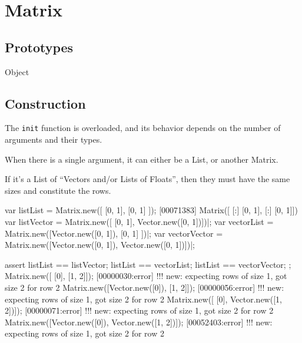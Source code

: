 
\section{Matrix}

\subsection{Prototypes}
\begin{refObjects}
\item[Object]
\end{refObjects}

\subsection{Construction}
\label{sec:specs:matrix:ctor}

The \lstinline|init| function is overloaded, and its behavior depends on the
number of arguments and their types.

When there is a single argument, it can either be a List, or another Matrix.

If it's a List of ``Vectors and/or Lists of Floats'', then they must have
the same sizes and constitute the rows.

\begin{urbiscript}
var listList     = Matrix.new([           [0, 1],             [0, 1] ]);
[00071383] Matrix([
[:]  [0, 1],
[:]  [0, 1]])
var listVector   = Matrix.new([           [0, 1],  Vector.new([0, 1])])|;
var vectorList   = Matrix.new([Vector.new([0, 1]),            [0, 1] ])|;
var vectorVector = Matrix.new([Vector.new([0, 1]), Vector.new([0, 1])])|;

assert
{
  listList == listVector;
  listList == vectorList;
  listList == vectorVector;
};
Matrix.new([           [0],            [1, 2]]);
[00000030:error] !!! new: expecting rows of size 1, got size 2 for row 2
Matrix.new([Vector.new([0]),           [1, 2]]);
[00000056:error] !!! new: expecting rows of size 1, got size 2 for row 2
Matrix.new([           [0], Vector.new([1, 2])]);
[00000071:error] !!! new: expecting rows of size 1, got size 2 for row 2
Matrix.new([Vector.new([0]), Vector.new([1, 2])]);
[00052403:error] !!! new: expecting rows of size 1, got size 2 for row 2
\end{urbiscript}

